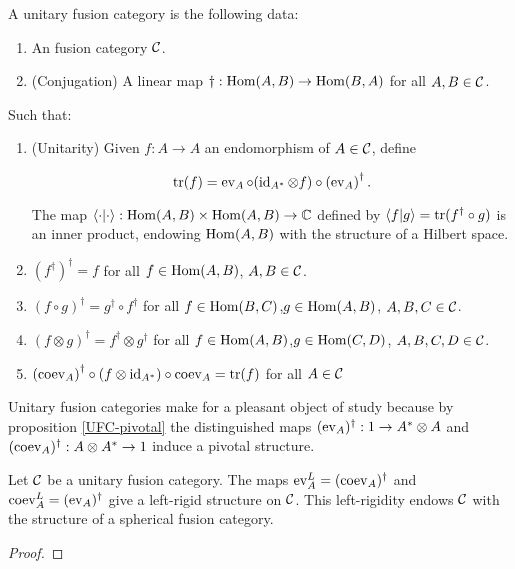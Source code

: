 \begin{defn} A unitary fusion category is the following data:

\begin{enumerate}
\item An fusion category ${\mathcal C}$.
\item (Conjugation) A linear map $\dagger: \operatorname{Hom}(A,B)\to \operatorname{Hom}(B,A)$ for all $A,B\in {\mathcal C}$.
\end{enumerate}

Such that:

\begin{enumerate}
\item (Unitarity) Given $f:A\to A$ an endomorphism of $A\in {\mathcal C}$, define


$$\operatorname{tr}(f)=\operatorname{ev}_A \circ (\operatorname{id}_{A^*}\otimes f)\circ \left(\operatorname{ev}_A\right)^{\dagger}.$$

The map $\left<\cdot|\cdot\right>:\operatorname{Hom}(A,B)\times \operatorname{Hom}(A,B)\to {\mathbb C}$ defined by $\left<f|g\right>=\operatorname{tr}(f^{\dagger}\circ g)$ is an inner product, endowing $\operatorname{Hom}(A,B)$ with the structure of a Hilbert space.
\item $\left(f^{\dagger}\right)^{\dagger}=f$ for all $f\in \operatorname{Hom}(A,B)$, $A,B\in {\mathcal C}$.

\item $(f\circ g)^{\dagger}=g^{\dagger}\circ f^{\dagger}$ for all $f\in \operatorname{Hom}(B,C)$,$g\in \operatorname{Hom}(A,B)$, $A,B,C\in {\mathcal C}$.

\item $(f\otimes g)^{\dagger}=f^{\dagger}\otimes g^{\dagger}$ for all $f\in \operatorname{Hom}(A,B)$,$g\in \operatorname{Hom}(C,D)$, $A,B,C,D\in {\mathcal C}$.
\item $\left(\operatorname{coev}_A\right)^{\dagger}\circ (f \otimes \operatorname{id}_{A^*})\circ \operatorname{coev}_A=\operatorname{tr}(f)$ for all $A\in {\mathcal C}$
\end{enumerate}
\end{defn}

\begin{rem}
Unitary fusion categories make for a pleasant object of study because by proposition \ref{UFC-pivotal} the distinguished maps $(\operatorname{ev}_A)^{\dagger}:1\to A^{*}\otimes A$ and $(\operatorname{coev}_A)^{\dagger}:A\otimes A^{*}\to 1$ induce a pivotal structure.
\end{rem}

\begin{prop}\label{UFC-pivotal} Let ${\mathcal C}$ be a unitary fusion category. The maps $\operatorname{ev}_{A}^L = (\operatorname{coev}_{A})^{\dagger}$ and $\operatorname{coev}^L_{A}=(\operatorname{ev}_A)^{\dagger}$ give a left-rigid structure on ${\mathcal C}$. This left-rigidity endows ${\mathcal C}$ with the structure of a spherical fusion category.
\end{prop}
\begin{proof}
\end{proof}

